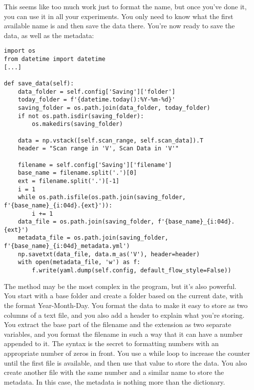 This seems like too much work just to format the name, but once you've done it, you can use it in all your experiments. You only need to know what the first available name is and then save the data there. You're now ready to save the data, as well as the metadata:

\begin{verbatim}
import os
from datetime import datetime
[...]

def save_data(self):
    data_folder = self.config['Saving']['folder']
    today_folder = f'{datetime.today():%Y-%m-%d}'
    saving_folder = os.path.join(data_folder, today_folder)
    if not os.path.isdir(saving_folder):
        os.makedirs(saving_folder)

    data = np.vstack([self.scan_range, self.scan_data]).T
    header = "Scan range in 'V', Scan Data in 'V'"

    filename = self.config['Saving']['filename']
    base_name = filename.split('.')[0]
    ext = filename.split('.')[-1]
    i = 1
    while os.path.isfile(os.path.join(saving_folder, f'{base_name}_{i:04d}.{ext}')):
        i += 1
    data_file = os.path.join(saving_folder, f'{base_name}_{i:04d}.{ext}')
    metadata_file = os.path.join(saving_folder, f'{base_name}_{i:04d}_metadata.yml')
    np.savetxt(data_file, data.m_as('V'), header=header)
    with open(metadata_file, 'w') as f:
        f.write(yaml.dump(self.config, default_flow_style=False))
\end{verbatim}

The  method may be the most complex in the program, but it's also powerful. You start with a base folder and create a folder based on the current date, with the format Year-Month-Day. You format the data to make it easy to store as two columns of a text file, and you also add a header to explain what you're storing. You extract the base part of the filename and the extension as two separate variables, and you format the filename in such a way that it can have a number appended to it. The syntax  is the secret to formatting numbers with an appropriate number of zeros in front. You use a while loop to increase the counter until the first file is available, and then use that value to store the data. You also create another file with the same number and a similar name to store the metadata. In this case, the metadata is nothing more than the  dictionary.


